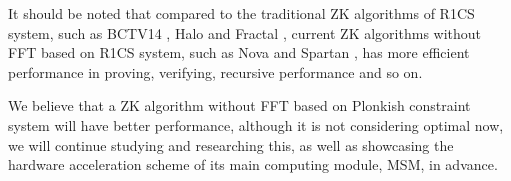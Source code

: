 It should be noted that compared to the traditional ZK algorithms of R1CS system, such as BCTV14 \cite{ben2014succinct}, Halo \cite{cryptoeprint:2019/1021} and Fractal \cite{Fractal}, current ZK algorithms without FFT based on R1CS system, such as Nova \cite{cryptoeprint:2021/370} and Spartan \cite{Spartan}, has more efficient performance in proving, verifying, recursive performance and so on.

We believe that a ZK algorithm without FFT based on Plonkish constraint system will have better performance, although it is not considering optimal now, we will continue studying and researching this, as well as showcasing the hardware acceleration scheme of its main computing module, MSM, in advance.
